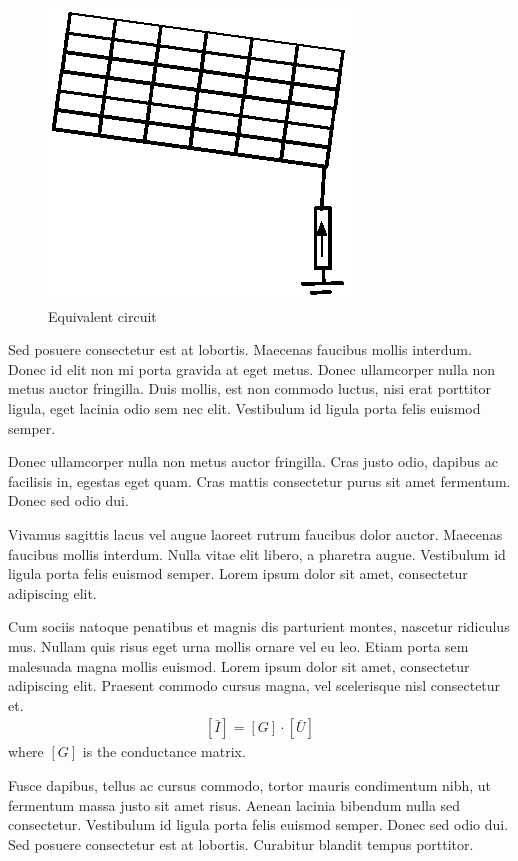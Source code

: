\documentclass[journal]{../template/IEEEtran}
\begin{document}
\begin{figure}[!tb]
	\centering
		\includegraphics[width=2.9 in]{../resources/image.eps}
		\caption{Equivalent circuit}
	\label{fig:circuitoequivalente}
\end{figure}

Sed posuere consectetur est at lobortis. Maecenas faucibus mollis interdum. Donec id elit non mi porta gravida at eget metus. Donec ullamcorper nulla non metus auctor fringilla. Duis mollis, est non commodo luctus, nisi erat porttitor ligula, eget lacinia odio sem nec elit. Vestibulum id ligula porta felis euismod semper.

Donec ullamcorper nulla non metus auctor fringilla. Cras justo odio, dapibus ac facilisis in, egestas eget quam. Cras mattis consectetur purus sit amet fermentum. Donec sed odio dui.

Vivamus sagittis lacus vel augue laoreet rutrum faucibus dolor auctor. Maecenas faucibus mollis interdum. Nulla vitae elit libero, a pharetra augue. Vestibulum id ligula porta felis euismod semper. Lorem ipsum dolor sit amet, consectetur adipiscing elit.

Cum sociis natoque penatibus et magnis dis parturient montes, nascetur ridiculus mus. Nullam quis risus eget urna mollis ornare vel eu leo. Etiam porta sem malesuada magna mollis euismod. Lorem ipsum dolor sit amet, consectetur adipiscing elit. Praesent commodo cursus magna, vel scelerisque nisl consectetur et.
\begin{align}
	\label{eq:bcurrent}
	\left[\bar{I} \right] = \left[G \right] \cdot \left[ \bar{U} \right]
\end{align}
where $[G]$ is the conductance matrix.

Fusce dapibus, tellus ac cursus commodo, tortor mauris condimentum nibh, ut fermentum massa justo sit amet risus. Aenean lacinia bibendum nulla sed consectetur. Vestibulum id ligula porta felis euismod semper. Donec sed odio dui. Sed posuere consectetur est at lobortis. Curabitur blandit tempus porttitor.
\end{document}
